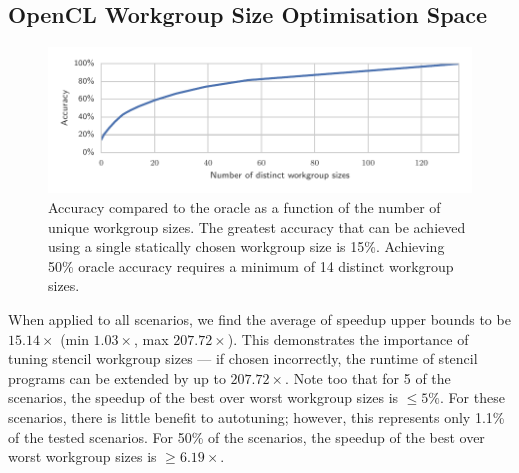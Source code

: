\documentclass[nonatbib,preprint,9pt]{sigplanconf}
\begin{document}
\subsection{OpenCL Workgroup Size Optimisation Space}

\begin{figure}
\centering
\includegraphics[width=\columnwidth]{img/num_params_oracle.pdf}
\caption{%
  Accuracy compared to the oracle as a function of the number of
  unique workgroup sizes. The greatest accuracy that can be achieved
  using a single statically chosen workgroup size is 15\%. Achieving
  50\% oracle accuracy requires a minimum of 14 distinct workgroup
  sizes.%
}
\label{fig:oracle-accuracy}
\end{figure}



When applied to all scenarios, we find the average of speedup upper
bounds to be $15.14\times$ (min $1.03\times$, max
$207.72\times$). This demonstrates the importance of tuning stencil
workgroup sizes --- if chosen incorrectly, the runtime of stencil
programs can be extended by up to $207.72\times$. Note too that for 5
of the scenarios, the speedup of the best over worst workgroup sizes
is $\le 5\%$. For these scenarios, there is little benefit to
autotuning; however, this represents only 1.1\% of the tested
scenarios. For 50\% of the scenarios, the speedup of the best over
worst workgroup sizes is $\ge 6.19\times$.
\end{document}
